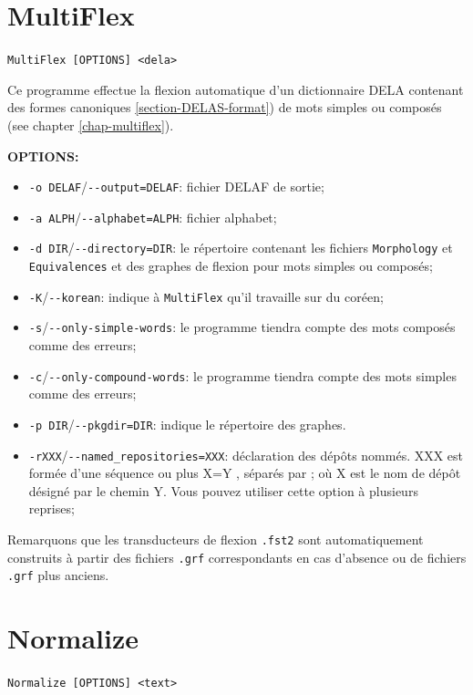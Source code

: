 \section{MultiFlex}
\verb+MultiFlex [OPTIONS] <dela>+

\bigskip
\noindent {}Ce programme effectue
la flexion automatique d'un dictionnaire DELA contenant des formes canoniques 
\ref{section-DELAS-format}) de mots simples ou composés (see chapter \ref{chap-multiflex}).

\bigskip
\noindent \textbf{OPTIONS:}
\begin{itemize}
\item \verb+-o DELAF+/\verb+--output=DELAF+: fichier DELAF de sortie;
  \item \verb+-a ALPH+/\verb+--alphabet=ALPH+: fichier alphabet;
  \item \verb+-d DIR+/\verb+--directory=DIR+: le répertoire contenant les fichiers 
  	  \verb+Morphology+ et \verb+Equivalences+ et des graphes de flexion pour mots
  	  simples ou composés;
  \item \verb+-K+/\verb+--korean+: indique à \verb+MultiFlex+ qu'il travaille sur du coréen;
  \item \verb+-s+/\verb+--only-simple-words+: le programme tiendra compte des mots composés comme
  	  des erreurs;
  \item \verb+-c+/\verb+--only-compound-words+: le programme tiendra compte des mots simples comme
  	  des erreurs;
  \item \verb+-p DIR+/\verb+--pkgdir=DIR+: indique le répertoire des graphes.
  \item \verb+-rXXX+/\verb+--named_repositories=XXX+: déclaration des dépôts nommés. XXX est formée
  	  d'une séquence ou plus X=Y , séparés par ; où X est le nom de dépôt désigné par le chemin
  	  Y. Vous pouvez utiliser cette option à plusieurs reprises;
  
\end{itemize}

\bigskip
\noindent Remarquons que les transducteurs de flexion \verb+.fst2+ sont automatiquement construits à
partir des fichiers \verb+.grf+ correspondants en cas d'absence ou de fichiers \verb+.grf+ plus
anciens.







\section{Normalize}
\label{section-Normalize}
\verb+Normalize [OPTIONS] <text>+

